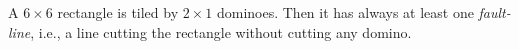 A $6 \times 6$ rectangle is tiled by $2 \times 1$ dominoes. Then it has always at least one \emph{fault-line}, i.e., a line cutting the rectangle without cutting any domino.
